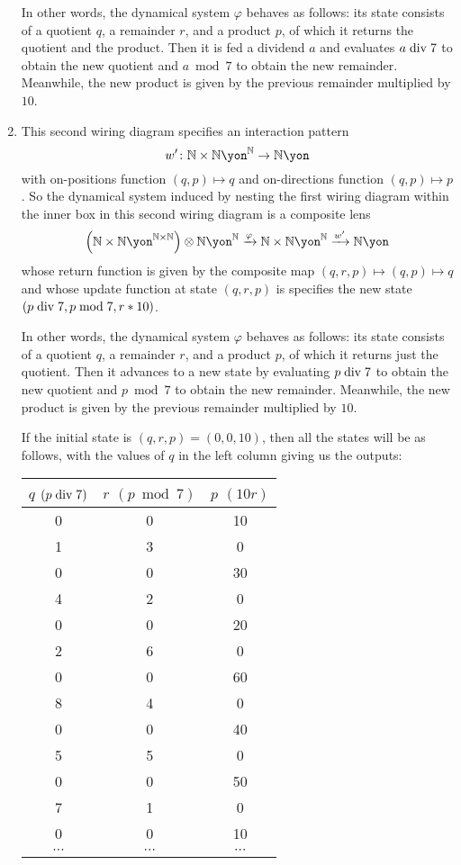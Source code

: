 \documentclass[Book-Poly]{subfiles}
\begin{document}
\begin{exercise}
\begin{solution}
\begin{enumerate}
    In other words, the dynamical system $\varphi$ behaves as follows: its state consists of a quotient $q$, a remainder $r$, and a product $p$, of which it returns the quotient and the product.
    Then it is fed a dividend $a$ and evaluates $a\bdiv7$ to obtain the new quotient and $a\bmod7$ to obtain the new remainder.
    Meanwhile, the new product is given by the previous remainder multiplied by $10$.

    \item This second wiring diagram specifies an interaction pattern
    \[
        w'\colon\nn\times\nn\yon^\nn\to\nn\yon
    \]
    with on-positions function $(q,p)\mapsto q$ and on-directions function $(q,p)\mapsto p$.
    So the dynamical system induced by nesting the first wiring diagram within the inner box in this second wiring diagram is a composite lens
    \[
        \left(\nn\times\nn\yon^{\nn\times\nn}\right)\otimes\nn\yon^\nn\To{\varphi}\nn\times\nn\yon^\nn\To{w'}\nn\yon
    \]
    whose return function is given by the composite map $(q,r,p)\mapsto(q,p)\mapsto q$ and whose update function at state $(q,r,p)$ is specifies the new state $(p\bdiv7,p\bmod7,r*10)$.

    In other words, the dynamical system $\varphi$ behaves as follows: its state consists of a quotient $q$, a remainder $r$, and a product $p$, of which it returns just the quotient.
    Then it advances to a new state by evaluating $p\bdiv7$ to obtain the new quotient and $p\bmod7$ to obtain the new remainder.
    Meanwhile, the new product is given by the previous remainder multiplied by $10$.

    If the initial state is $(q,r,p)=(0,0,10)$, then all the states will be as follows, with the values of $q$ in the left column giving us the outputs:
    \begin{table}[hbt!]
        \centering
        \footnotesize
        \begin{tabular}{c|c|c}
            $q$ $(p\bdiv7)$ & $r$ $(p\bmod7)$ & $p$ $(10r)$ \\
            \hline
            0 & 0 & 10 \\
            1 & 3 & 0 \\
            0 & 0 & 30 \\
            4 & 2 & 0 \\
            0 & 0 & 20 \\
            2 & 6 & 0 \\
            0 & 0 & 60 \\
            8 & 4 & 0 \\
            0 & 0 & 40 \\
            5 & 5 & 0 \\
            0 & 0 & 50 \\
            7 & 1 & 0 \\
            0 & 0 & 10 \\
            $\cdots$ & $\cdots$ & $\cdots$
        \end{tabular}
    \end{table}
\end{enumerate}
\end{solution}
\end{exercise}
\end{document}
